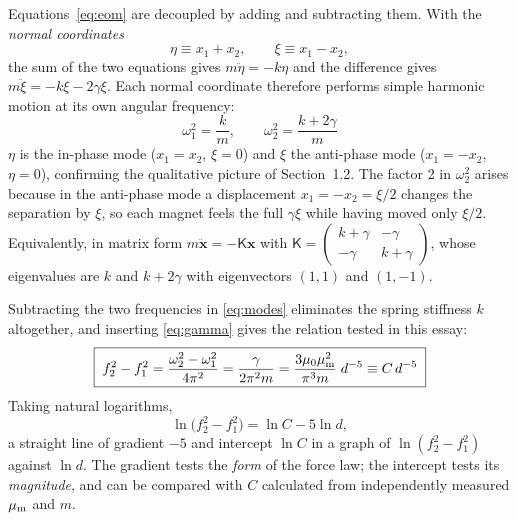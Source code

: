 Equations~\eqref{eq:eom} are decoupled by adding and subtracting them. With the \emph{normal coordinates}
\begin{equation}
\eta\equiv x_1+x_2,\qquad \xi\equiv x_1-x_2,
\end{equation}
the sum of the two equations gives $m\ddot\eta=-k\eta$ and the difference gives $m\ddot\xi=-k\xi-2\gamma\xi$. Each normal coordinate therefore performs simple harmonic motion at its own angular frequency:
\begin{equation}
\boxed{\;\omega_1^2=\frac{k}{m},\qquad \omega_2^2=\frac{k+2\gamma}{m}\;}
\label{eq:modes}
\end{equation}
$\eta$ is the in-phase mode ($x_1=x_2$, $\xi=0$) and $\xi$ the anti-phase mode ($x_1=-x_2$, $\eta=0$), confirming the qualitative picture of Section~1.2. The factor 2 in $\omega_2^2$ arises because in the anti-phase mode a displacement $x_1=-x_2=\xi/2$ changes the separation by $\xi$, so each magnet feels the full $\gamma\xi$ while having moved only $\xi/2$. Equivalently, in matrix form $m\ddot{\bm x}=-\mathsf K\bm x$ with $\mathsf K=\begin{pmatrix}k+\gamma&-\gamma\\-\gamma&k+\gamma\end{pmatrix}$, whose eigenvalues are $k$ and $k+2\gamma$ with eigenvectors $(1,1)$ and $(1,-1)$.

Subtracting the two frequencies in \eqref{eq:modes} eliminates the spring stiffness $k$ altogether, and inserting \eqref{eq:gamma} gives the relation tested in this essay:
\begin{equation}
\boxed{\;f_2^2-f_1^2=\frac{\omega_2^2-\omega_1^2}{4\pi^2}=\frac{\gamma}{2\pi^2 m}
      =\frac{3\mu_0\mu_{\mathrm m}^2}{\pi^3 m}\;d^{-5}\equiv C\,d^{-5}\;}
\label{eq:main}
\end{equation}
Taking natural logarithms,
\begin{equation}
\ln\!\big(f_2^2-f_1^2\big)=\ln C-5\ln d ,
\label{eq:lnln}
\end{equation}
a straight line of gradient $-5$ and intercept $\ln C$ in a graph of $\ln(f_2^2-f_1^2)$ against $\ln d$. The gradient tests the \emph{form} of the force law; the intercept tests its \emph{magnitude}, and can be compared with $C$ calculated from independently measured $\mu_{\mathrm m}$ and $m$.

